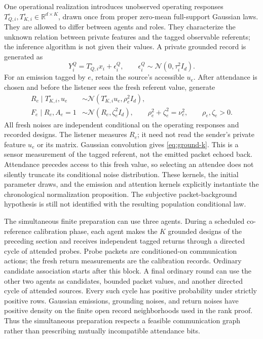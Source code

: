\documentclass[11pt]{article}
\theoremstyle{definition}
\theoremstyle{remark}
\newcommand{\R}{\mathbb R}
\newcommand{\N}{\mathcal N}
\begin{document}
One operational realization introduces unobserved operating responses \(T_{Q,i}^{\circ},T_{K,i}^{\circ}\in\R^{d\times K}\), drawn once from proper zero-mean full-support Gaussian laws. They are allowed to differ between agents and roles. They characterize the unknown relation between private features and the tagged observable referents; the inference algorithm is not given their values. A private grounded record is generated as
\[
Y_i^Q=T_{Q,i}^{\circ}x_i+\epsilon_i^Q,
\qquad \epsilon_i^Q\sim\N(0,\tau_i^2I_d).
\]
For an emission tagged by \(e\), retain the source's accessible \(u_e\). After attendance is chosen and before the listener sees the fresh referent value, generate
\begin{align}
R_e\mid T_{K,i}^{\circ},u_e&\sim\N(T_{K,i}^{\circ}u_e,\rho_e^2I_d),\nonumber\\
F_e\mid R_e,A_e=1&\sim\N(R_e,\zeta_e^2I_d),\qquad
\rho_e^2+\zeta_e^2=\nu_e^2,\qquad \rho_e,\zeta_e>0.
\label{eq:operational-return}
\end{align}
All fresh noises are independent conditional on the operating responses and recorded designs. The listener measures \(R_e\); it need not read the sender's private feature \(u_e\) or its matrix. Gaussian convolution gives \eqref{eq:ground-k}. This is a sensor measurement of the tagged referent, not the emitted packet echoed back. Attendance precedes access to this fresh value, so selecting an attendee does not silently truncate its conditional noise distribution. These kernels, the initial parameter draws, and the emission and attention kernels explicitly instantiate the chronological normalization proposition. The subjective packet-background hypothesis is still not identified with the resulting population conditional law.

The simultaneous finite preparation can use three agents. During a scheduled co-reference calibration phase, each agent makes the \(K\) grounded designs of the preceding section and receives independent tagged returns through a directed cycle of attended probes. Probe packets are conditioned-on communication actions; the fresh return measurements are the calibration records. Ordinary candidate association starts after this block. A final ordinary round can use the other two agents as candidates, bounded packet values, and another directed cycle of attended sources. Every such cycle has positive probability under strictly positive rows. Gaussian emissions, grounding noises, and return noises have positive density on the finite open record neighborhoods used in the rank proof. Thus the simultaneous preparation respects a feasible communication graph rather than prescribing mutually incompatible attendance bits.
\end{document}
